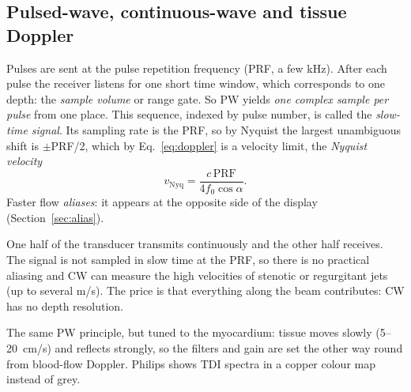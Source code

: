 \documentclass[11pt,a4paper]{article}
\newcommand{\vnyq}{v_{\mathrm{Nyq}}}
\begin{document}
\subsection{Pulsed-wave, continuous-wave and tissue Doppler}
\begin{description}[leftmargin=1.2em]
\item[Pulsed wave (PW).] Pulses are sent at the pulse repetition frequency (PRF, a few kHz). After each pulse the
receiver listens for one short time window, which corresponds to one depth: the \emph{sample volume} or range gate.
So PW yields \emph{one complex sample per pulse} from one place. This sequence, indexed by pulse number, is called the
\emph{slow-time signal}. Its sampling rate is the PRF, so by Nyquist the largest unambiguous shift is $\pm$PRF/2,
which by Eq.~\eqref{eq:doppler} is a velocity limit, the \emph{Nyquist velocity}
\begin{equation}
\vnyq = \frac{c\,\mathrm{PRF}}{4 f_0 \cos\alpha}.
\label{eq:nyq}
\end{equation}
Faster flow \emph{aliases}: it appears at the opposite side of the display (Section~\ref{sec:alias}).
\item[Continuous wave (CW).] One half of the transducer transmits continuously and the other half receives. The
signal is not sampled in slow time at the PRF, so there is no practical aliasing and CW can measure the high
velocities of stenotic or regurgitant jets (up to several m/s). The price is that everything along the beam
contributes: CW has no depth resolution.
\item[Tissue Doppler (TDI).] The same PW principle, but tuned to the myocardium: tissue moves slowly (5--20~cm/s)
and reflects strongly, so the filters and gain are set the other way round from blood-flow Doppler. Philips shows
TDI spectra in a copper colour map instead of grey.
\end{description}
\end{document}
